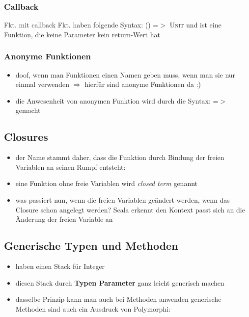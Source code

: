 \subsubsection{Callback}
Fkt. mit callback Fkt. haben folgende Syntax: 
  \textsc{() =$>$ Unit} und ist eine Funktion, die keine Parameter \und 
  kein return-Wert hat
  
  


\subsubsection{Anonyme Funktionen}
\begin{itemize}
  \item doof, wenn man Funktionen einen Namen geben muss, wenn man sie
  nur einmal verwenden $\Rightarrow$ hierfür sind anonyme Funktionen da :)
  \item die Anwesenheit von anonymen Funktion wird durch die Syntax:
  \textsc{=$>$} gemacht
  
  
\end{itemize}


\subsection{Closures}
\begin{itemize}
  \item der Name stammt daher, dass die Funktion durch Bindung der freien
  Variablen an seinen Rumpf entsteht:
  
  
  
  \item eine Funktion ohne freie Variablen wird \textit{closed term} genannt
  \item was passiert nun, wenn die freien Variablen geändert werden,
  wenn das Closure schon angelegt werden? Scala erkennt den Kontext \und 
  passt sich an die Änderung der freien Variable an
\end{itemize}


\subsection{Generische Typen und Methoden}
\begin{itemize}
  \item haben einen Stack für Integer
  
  
  
  \item diesen Stack durch \textbf{Typen Parameter} ganz leicht generisch machen
  
  
  
  \item dasselbe Prinzip kann man auch bei Methoden anwenden \und generische
  Methoden sind auch ein Ausdruck von Polymorphi:
  
  
\end{itemize}


